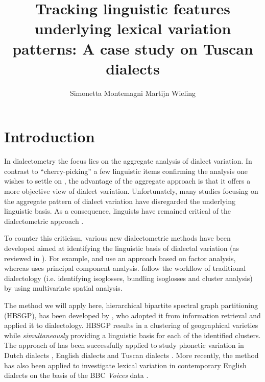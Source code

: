 \documentclass[output=paper]{LSP/langsci}
\author{Simonetta Montemagni\affiliation{Istituto di Linguistica Computazionale “Antonio Zampolli”, ILC-CNR} \lastand Martijn Wieling\affiliation{University of Groningen, CLCG}}
\title{Tracking linguistic features underlying lexical variation patterns: A case study on Tuscan dialects}
\begin{document}
 
 
% 

% 
% 
% 
% 

\section{Introduction}
In dialectometry \citep{seguy_relation_1971} the focus lies on the aggregate analysis of dialect variation. In contrast to “cherry-picking” a few linguistic items confirming the analysis one wishes to settle on \citep{nerbonne_data-driven_2009}, the advantage of the aggregate approach is that it offers a more objective view of dialect variation. Unfortunately, many studies focusing on the aggregate pattern of dialect variation have disregarded the underlying linguistic basis. As a consequence, linguists have remained critical of the dialectometric approach \citep{schneider_qualitative_1988,woolhiser_political_2005, loporcaro_profilo_2009}. 

To counter this criticism, various new dialectometric methods have been developed aimed at identifying the linguistic basis of dialectal variation (as reviewed in \citealt{wieling_advances_2015}). For example, \citet{nerbonne_identifying_2006} and \citet{proll_latente_inpress} use an approach based on factor analysis, whereas \citet{shackleton_english-american_2005} uses principal component analysis. \citet{GrieveEtAl2011} follow the workflow of traditional dialectology (i.e. identifying isoglosses, bundling isoglosses and cluster analysis) by using multivariate spatial analysis. 

The method we will apply here, hierarchical bipartite spectral graph partitioning (HBSGP), has been developed by \citet{wieling_bipartite_2009,wieling_hierarchical_2010, wieling_bipartite_2011}, who adopted it from information retrieval \citep{dhillon_co-clustering_2001} and applied it to dialectology. HBSGP results in a clustering of geographical varieties while \emph{simultaneously }providing a linguistic basis for each of the identified clusters. The approach of \citet{wieling_bipartite_2011} has been successfully applied to study phonetic variation in Dutch dialects \citep{wieling_bipartite_2011}, English dialects \citep{wieling_analyzing_2013} and Tuscan dialects \citep{montemagni_patterns_2012,montemagni_synchronic_2013}. More recently, the method has also been applied to investigate lexical variation in contemporary English dialects on the basis of the BBC \textit{Voices} data \citep{wieling_lexical_2014}.
\end{document}
